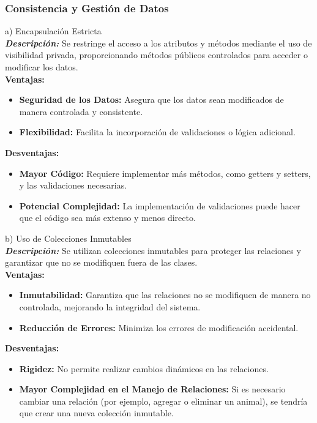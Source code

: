 \subsubsection{Consistencia y Gestión de Datos}

\textbf{}{a) Encapsulación Estricta}\\

\textit{\textbf{Descripción:} } 
Se restringe el acceso a los atributos y métodos mediante el uso de visibilidad privada, proporcionando métodos públicos controlados para acceder o modificar los datos.\\

\textbf{Ventajas:}
\begin{itemize}
    \item \textbf{Seguridad de los Datos:} Asegura que los datos sean modificados de manera controlada y consistente.
    \item \textbf{Flexibilidad:} Facilita la incorporación de validaciones o lógica adicional.
\end{itemize}

\textbf{Desventajas:}
\begin{itemize}
    \item \textbf{Mayor Código:} Requiere implementar más métodos, como getters y setters, y las validaciones necesarias.
    \item \textbf{Potencial Complejidad:} La implementación de validaciones puede hacer que el código sea más extenso y menos directo.
\end{itemize}

\textbf{}{b) Uso de Colecciones Inmutables}\\

\textit{\textbf{Descripción:}}  
Se utilizan colecciones inmutables para proteger las relaciones y garantizar que no se modifiquen fuera de las clases.\\

\textbf{Ventajas:}
\begin{itemize}
    \item \textbf{Inmutabilidad:} Garantiza que las relaciones no se modifiquen de manera no controlada, mejorando la integridad del sistema.
    \item \textbf{Reducción de Errores:} Minimiza los errores de modificación accidental.
\end{itemize}

\textbf{Desventajas:}
\begin{itemize}
    \item \textbf{Rigidez:} No permite realizar cambios dinámicos en las relaciones.
    \item \textbf{Mayor Complejidad en el Manejo de Relaciones:} Si es necesario cambiar una relación (por ejemplo, agregar o eliminar un animal), se tendría que crear una nueva colección inmutable.
\end{itemize}

